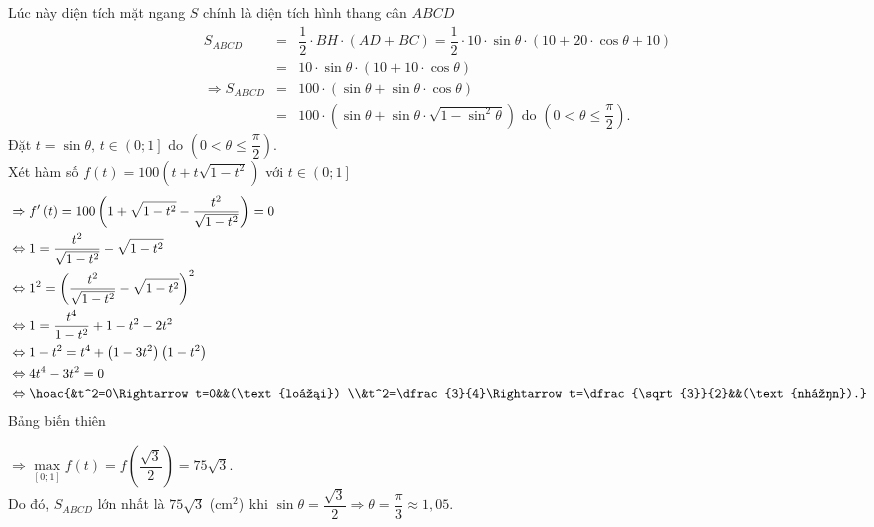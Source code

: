 \begin{bt}
{		Lúc này diện tích mặt ngang $S$ chính là diện tích hình thang cân $ABCD$
		\allowdisplaybreaks
		\begin{eqnarray*}
			S_{ABCD}&=&\dfrac{1}{2}\cdot BH\cdot \left(AD+BC\right)=\dfrac{1}{2}\cdot 10\cdot \sin \theta \cdot \left(10+20\cdot \cos \theta +10\right)\\
			&=&10\cdot \sin \theta \cdot \left(10+10\cdot \cos \theta\right)\\
			\Rightarrow {S_{ABCD}}&=&100\cdot \left(\sin \theta +\sin \theta\cdot \cos \theta\right)\\
			&=&100\cdot \left(\sin \theta +\sin \theta\cdot \sqrt{1-\sin^2\theta}\right)\text{ do }\left(0<\theta \le \dfrac{\pi}{2}\right).
		\end{eqnarray*}
		Đặt $t=\sin \theta,\,t\in \left(0;1\right]$ do $\left(0<\theta \le \dfrac{\pi}{2}\right)$.\\
		Xét hàm số $f\left(t\right)=100\left(t+t\sqrt{1-t^2}\right)$ với $t\in \left(0;1\right]$
		$$\begin{aligned}
			& \Rightarrow f'\left(t\right)=100\left(1+\sqrt{1-t^2}-\dfrac{t^2}{\sqrt{1-t^2}}\right)=0 \\
			& \Leftrightarrow 1=\dfrac{t^2}{\sqrt{1-t^2}}-\sqrt{1-t^2} \\
			& \Leftrightarrow{1^2}=\left(\dfrac{t^2}{\sqrt{1-t^2}}-\sqrt{1-t^2}\right)^2 \\
			& \Leftrightarrow 1=\dfrac{t^4}{1-t^2}+1-t^2-2t^2 \\
			& \Leftrightarrow 1-t^2=t^4+\left(1-3t^2\right)\left(1-t^2\right) \\
			& \Leftrightarrow 4t^4-3t^2=0 \\
			& \Leftrightarrow \hoac{&t^2=0\Rightarrow t=0&&(\text{loại}) \\&t^2=\dfrac{3}{4}\Rightarrow t=\dfrac{\sqrt{3}}{2}&&(\text{nhận}).} \\
		\end{aligned}$$
		Bảng biến thiên
		\begin{center}
		\end{center}
		$\Rightarrow \max\limits_{\left[0;1\right]}f\left(t\right)=f\left(\dfrac{\sqrt{3}}{2}\right)=75\sqrt{3}$.\\
		Do đó, $S_{ABCD}$ lớn nhất là $75\sqrt{3}$ (cm$^2$) khi $\sin \theta =\dfrac{\sqrt{3}}{2}\Rightarrow \theta =\dfrac{\pi}{3}\approx 1{,}05$.
	}
\end{bt}

